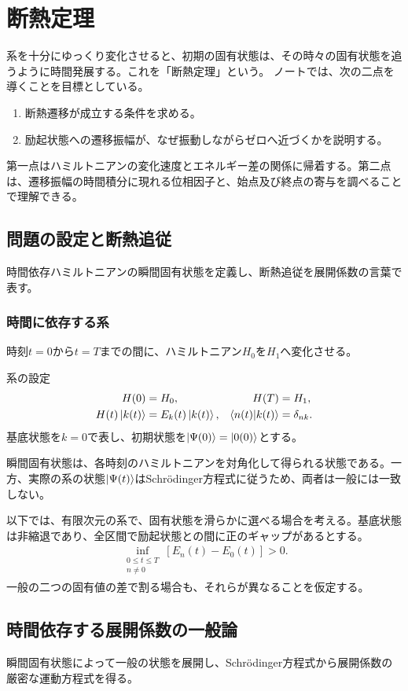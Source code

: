 \documentclass[a4paper,10.5pt]{article}
\numberwithin{equation}{section}
\begin{document}
\section{断熱定理}
系を十分にゆっくり変化させると、初期の固有状態は、その時々の固有状態を追うように時間発展する。これを「断熱定理」という。 ノートでは、次の二点を導くことを目標としている。
\begin{goalbox}
\begin{enumerate}
\item 断熱遷移が成立する条件を求める。
\item 励起状態への遷移振幅が、なぜ振動しながらゼロへ近づくかを説明する。
\end{enumerate}
\end{goalbox}
第一点はハミルトニアンの変化速度とエネルギー差の関係に帰着する。第二点は、遷移振幅の時間積分に現れる位相因子と、始点及び終点の寄与を調べることで理解できる。

\subsection{問題の設定と断熱追従}
時間依存ハミルトニアンの瞬間固有状態を定義し、断熱追従を展開係数の言葉で表す。
\subsubsection{時間に依存する系}
時刻$t=0$から$t=T$までの間に、ハミルトニアン$H_0$を$H_1$へ変化させる。
\begin{setupbox}{系の設定}
\begin{align}
H(0)&=H_0,&H(T)&=H_1,\\
H(t)\ket{k(t)}&=E_k(t)\ket{k(t)},&
\braket{n(t)}{k(t)}&=\delta_{nk}.
\end{align}
基底状態を$k=0$で表し、初期状態を$\ket{\Psi(0)}=\ket{0(0)}$とする。
\end{setupbox}
瞬間固有状態は、各時刻のハミルトニアンを対角化して得られる状態である。一方、実際の系の状態$\ket{\Psi(t)}$はSchrödinger方程式に従うため、両者は一般には一致しない。

以下では、有限次元の系で、固有状態を滑らかに選べる場合を考える。基底状態は非縮退であり、全区間で励起状態との間に正のギャップがあるとする。
\begin{align}
\inf_{\substack{0\leq t\leq T\\n\neq0}}
\left[E_n(t)-E_0(t)\right]>0.
\end{align}
一般の二つの固有値の差で割る場合も、それらが異なることを仮定する。

\subsection{時間依存する展開係数の一般論}
瞬間固有状態によって一般の状態を展開し、Schrödinger方程式から展開係数の厳密な運動方程式を得る。
\end{document}
